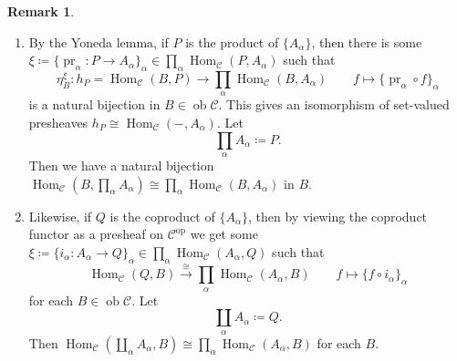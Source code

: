 \documentclass[10pt,letterpaper,cm]{nupset}
\theoremstyle{definition}
\newtheorem{remark}{Remark}
\newcommand{\1}{\mathbf{1}}
\renewcommand{\c}{\mathscr{C}}
\newcommand{\0}{\vec 0}
\DeclareMathOperator{\op}{op}
\DeclareMathOperator{\ob}{ob}
\DeclareMathOperator{\pr}{pr}
\DeclareMathOperator{\Hom}{Hom}
\begin{document}
\begin{remark} $ $
\begin{enumerate}
\item By the Yoneda lemma, if $P$ is the product of $\{A_{\alpha}\}$, then there is some $\xi \coloneqq \{\pr_{\alpha} : P \to A_{\alpha}\}_{\alpha} \in \prod_{\alpha}\Hom_{\c}(P, A_{\alpha})$ such that $$\eta^{\xi}_B : h_P = \Hom_{\c}(B, P) \to \prod_{\alpha}\Hom_{\c} (B, A_{\alpha}) \quad \quad f \mapsto \{\pr_{\alpha} \circ f\}_{\alpha}$$ is a natural bijection in $B \in \ob \c$. This gives an isomorphism of set-valued presheaves $h_P \cong \Hom_{\c}(-, A_{\alpha})$. Let $$\prod_{\alpha} A_{\alpha} \coloneqq  P.$$ Then we have a natural bijection $\Hom_{\c}(B, \prod_{\alpha} A_{\alpha}) \cong \prod_{\alpha} \Hom_{\c}(B, A_{\alpha})$ in $B$.
\item Likewise, if $Q$ is the coproduct of $\{A_{\alpha}\}$, then by viewing the coproduct functor as a presheaf on $\c^{\op}$ we get some $\xi\coloneqq  \{i_{\alpha} : A_{\alpha} \to Q\}_{\alpha} \in \prod_{\alpha}\Hom_{\c}(A_{\alpha}, Q)$ such that $$\Hom_{\c} (Q, B) \overset{\cong}{\longrightarrow} \prod_{\alpha}\Hom_{\c} (A_{\alpha}, B) \quad \quad f \mapsto \{f \circ i_{\alpha}\}_{\alpha}$$ for each $B\in \ob \c$. Let $$\coprod_{\alpha} A_{\alpha} \coloneqq  Q.$$ Then $\Hom_{\c}(\coprod_{\alpha} A_{\alpha}, B) \cong \prod_{\alpha}\Hom_{\c}(A_{\alpha}, B)$ for each $B$.
\end{enumerate}
\end{remark}
\end{document}
